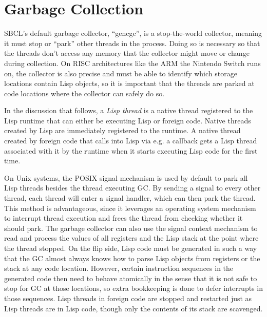 \documentclass[format=sigconf]{acmart}
\begin{document}
\section{Garbage Collection}\label{gc}
SBCL's default garbage collector, ``gencgc'', is a stop-the-world collector, meaning it must stop or ``park'' other threads in the process. Doing so is necessary so that the threads don't access any memory that the collector might move or change during collection. On RISC architectures like the ARM the Nintendo Switch runs on, the collector is also precise and must be able to identify which storage locations contain Lisp objects, so it is important that the threads are parked at code locations where the collector can safely do so.

In the discussion that follows, a \textit{Lisp thread} is a native thread registered to the Lisp runtime that can either be executing Lisp or foreign code. Native threads created by Lisp are immediately registered to the runtime. A native thread created by foreign code that calls into Lisp via e.g. a callback gets a Lisp thread associated with it by the runtime when it starts executing Lisp code for the first time.

On Unix systems, the POSIX signal mechanism is used by default to park all Lisp threads besides the thread executing GC. By sending a signal to every other thread, each thread will enter a signal handler, which can then park the thread. This method is advantageous, since it leverages an operating system mechanism to interrupt thread execution and frees the thread from checking whether it should park. The garbage collector can also use the signal context mechanism to read and process the values of all registers and the Lisp stack at the point where the thread stopped. On the flip side, Lisp code must be generated in such a way that the GC almost always knows how to parse Lisp objects from registers or the stack at any code location. However, certain instruction sequences in the generated code then need to behave atomically in the sense that it is not safe to stop for GC at those locations, so extra bookkeeping is done to defer interrupts in those sequences. Lisp threads in foreign code are stopped and restarted just as Lisp threads are in Lisp code, though only the contents of its stack are scavenged.
\end{document}
